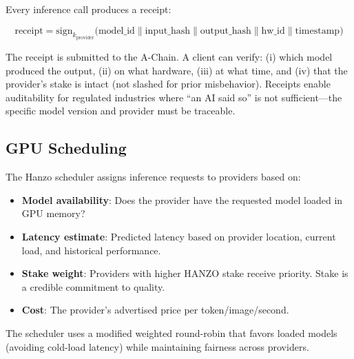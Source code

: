 Every inference call produces a receipt:

\begin{equation}
\text{receipt} = \text{sign}_{k_{\text{provider}}}\bigl(
\text{model\_id} \| \text{input\_hash} \| \text{output\_hash} \|
\text{hw\_id} \| \text{timestamp}
\bigr)
\end{equation}

The receipt is submitted to the A-Chain. A client can verify: (i) which model
produced the output, (ii) on what hardware, (iii) at what time, and (iv) that
the provider's stake is intact (not slashed for prior misbehavior). Receipts
enable auditability for regulated industries where ``an AI said so'' is not
sufficient---the specific model version and provider must be traceable.

\subsection{GPU Scheduling}

The Hanzo scheduler assigns inference requests to providers based on:

\begin{itemize}[leftmargin=1.1em]
    \item \textbf{Model availability}: Does the provider have the requested
    model loaded in GPU memory?
    \item \textbf{Latency estimate}: Predicted latency based on provider
    location, current load, and historical performance.
    \item \textbf{Stake weight}: Providers with higher HANZO stake receive
    priority. Stake is a credible commitment to quality.
    \item \textbf{Cost}: The provider's advertised price per token/image/second.
\end{itemize}

The scheduler uses a modified weighted round-robin that favors loaded models
(avoiding cold-load latency) while maintaining fairness across providers.

